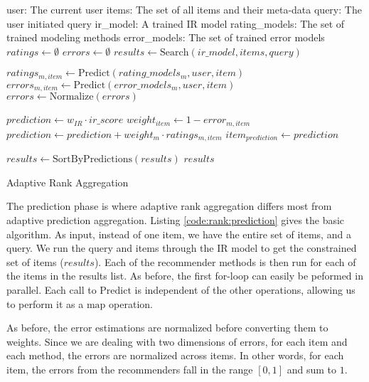 \begin{algorithm}[t]
  \begin{algorithmic}[1]
  \REQUIRE user: The current user
  \REQUIRE items: The set of all items and their meta-data
  \REQUIRE query: The user initiated query
  \REQUIRE ir\_model: A trained IR model
  \REQUIRE rating\_models: The set of trained modeling methods 
  \REQUIRE error\_models: The set of trained error models
  \ENSURE
    \STATE $ratings \gets \emptyset$
    \STATE $errors  \gets \emptyset$
    \STATE $results \gets \mathrm{Search}(ir\_model, items, query)$
    
        \STATE $ratings_{m,item} \gets \mathrm{Predict}(rating\_models_m, user, item)$
        \STATE $errors_{m,item}  \gets \mathrm{Predict}(error\_models_m, user, item)$
      \ENDFOR 
    \ENDFOR
    \STATE $errors \gets \mathrm{Normalize}(errors)$

      \STATE $prediction \gets w_{IR} \cdot ir\_score$
        \STATE $weight_{item} \gets 1 - error_{m,item}$
        \STATE $prediction \gets prediction + weight_m \cdot ratings_{m,item}$
      \ENDFOR
      \STATE $item_{prediction} \gets prediction$
    \ENDFOR
    
    \STATE $results \gets \mathrm{SortByPredictions}(results)$
  \RETURN $results$

  \end{algorithmic}
  \caption[Adaptive Rank Aggregation]{Adaptive Rank Aggregation}
  \label{code:rank:prediction}
\end{algorithm}

The prediction phase is where adaptive rank aggregation differs most from adaptive prediction aggregation.
Listing \ref{code:rank:prediction} gives the basic algorithm.
As input, instead of one item, we have the entire set of items, and a query.
We run the query and items through the IR model to get the constrained set of items ($results$).
Each of the recommender methods is then run for each of the items in the results list.
As before, the first for-loop can easily be peformed in parallel.
Each call to $\mathrm{Predict}$ is independent of the other operations,
allowing us to perform it as a $\mathrm{map}$ operation.

As before, the error estimations are normalized before converting them to weights.
Since we are dealing with two dimensions of errors, for each item and each method,
the errors are normalized across items.
In other words, for each item, the errors from the recommenders fall in the range $[0,1]$ and sum to $1$.

